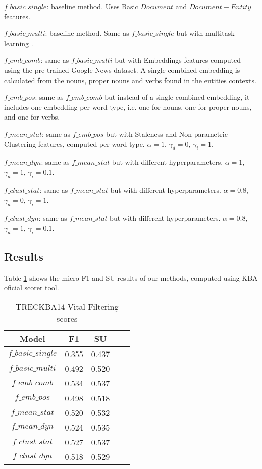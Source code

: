 \documentclass{article}
\begin{document}
\begin{itemize*}
  \item $f\_basic\_single$: baseline method. Uses Basic $Document$ and $Document-Entity$ features.
  \item $f\_basic\_multi$: baseline method. Same as $f\_basic\_single$ but with multitask-learning \cite{Caruana93multitasklearning}.
  \item $f\_emb\_comb$: same as $f\_basic\_multi$ but with Embeddings features computed using the pre-trained Google News dataset. A single combined embedding is calculated from the nouns, proper nouns and verbs found in the entities contexts.
  \item $f\_emb\_pos$: same as $f\_emb\_comb$ but instead of a single combined embedding, it includes one embedding per word type, i.e. one for nouns, one for proper nouns, and one for verbs.
  \item $f\_mean\_stat$: same as $f\_emb\_pos$ but with Staleness and Non-parametric Clustering features, computed per word type. $\alpha = 1$, $\gamma_d = 0$, $\gamma_i = 1$.
  \item $f\_mean\_dyn$: same as $f\_mean\_stat$ but with different hyperparameters. $\alpha = 1$, $\gamma_d = 1$, $\gamma_i = 0.1$.
  \item $f\_clust\_stat$: same as $f\_mean\_stat$ but with different hyperparameters. $\alpha = 0.8$, $\gamma_d = 0$, $\gamma_i = 1$.
  \item $f\_clust\_dyn$: same as $f\_mean\_stat$ but with different hyperparameters. $\alpha = 0.8$, $\gamma_d = 1$, $\gamma_i = 0.1$.
\end{itemize*}

\subsection{Results}

Table \ref{res} shows the micro F1 and SU results of our methods, computed using KBA oficial scorer tool.

\begin{table}[H]
\center
\begin{tabular}{|c|c|c|c|c|} \hline
\textbf{Model} & \textbf{F1} & \textbf{SU} \\ \hline\hline
$f\_basic\_single$ & 0.355 & 0.437 \\ \hline
$f\_basic\_multi$ & 0.492 & 0.520 \\ \hline
$f\_emb\_comb$ & 0.534 & 0.537 \\ \hline
$f\_emb\_pos$ & 0.498 & 0.518 \\ \hline
$f\_mean\_stat$ & 0.520 & 0.532 \\ \hline
$f\_mean\_dyn$ & 0.524 & 0.535 \\ \hline
$f\_clust\_stat$ & 0.527 & 0.537 \\ \hline
$f\_clust\_dyn$ & 0.518 & 0.529 \\ \hline
\end{tabular}
\caption{TRECKBA14 Vital Filtering scores}
\label{res}
\end{table}
\end{document}
